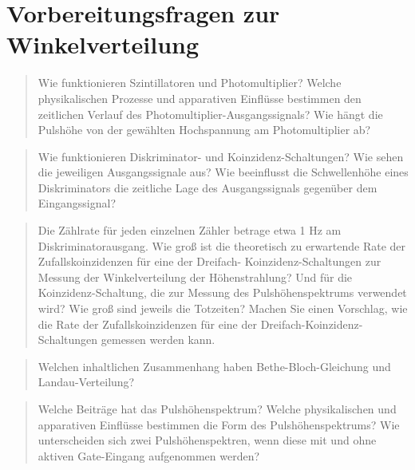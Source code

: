 \documentclass[11pt, ngerman, fleqn, DIV=15, headinclude, BCOR=2cm]{scrreprt}
\begin{document}
\section{Vorbereitungsfragen zur Winkelverteilung}

\parencite[11]{physik512-Anleitung}

\begin{quote}
    Wie funktionieren Szintillatoren und Photomultiplier? Welche physikalischen
    Prozesse und apparativen Einflüsse bestimmen den zeitlichen Verlauf des
    Photomultiplier-Ausgangssignals? Wie hängt die Pulshöhe von der gewählten
    Hochspannung am Photomultiplier ab?
\end{quote}


\begin{quote}
    Wie funktionieren Diskriminator- und Koinzidenz-Schaltungen? Wie sehen die
    jeweiligen Ausgangssignale aus? Wie beeinflusst die Schwellenhöhe eines
    Diskriminators die zeitliche Lage des Ausgangssignals gegenüber dem
    Eingangssignal?
\end{quote}


\begin{quote}
    Die Zählrate für jeden einzelnen Zähler betrage etwa 1 Hz am
    Diskriminatorausgang. Wie groß ist die theoretisch zu erwartende Rate der
    Zufallskoinzidenzen für eine der Dreifach- Koinzidenz-Schaltungen zur
    Messung der Winkelverteilung der Höhenstrahlung? Und für die
    Koinzidenz-Schaltung, die zur Messung des Pulshöhenspektrums verwendet
    wird? Wie groß sind jeweils die Totzeiten? Machen Sie einen Vorschlag, wie
    die Rate der Zufallskoinzidenzen für eine der
    Dreifach-Koinzidenz-Schaltungen gemessen werden kann.
\end{quote}


\begin{quote}
    Welchen inhaltlichen Zusammenhang haben Bethe-Bloch-Gleichung und
    Landau-Verteilung?
\end{quote}


\begin{quote}
    Welche Beiträge hat das Pulshöhenspektrum? Welche physikalischen und
    apparativen Einflüsse bestimmen die Form des Pulshöhenspektrums? Wie
    unterscheiden sich zwei Pulshöhenspektren, wenn diese mit und ohne aktiven
    Gate-Eingang aufgenommen werden?
\end{quote}
\end{document}
